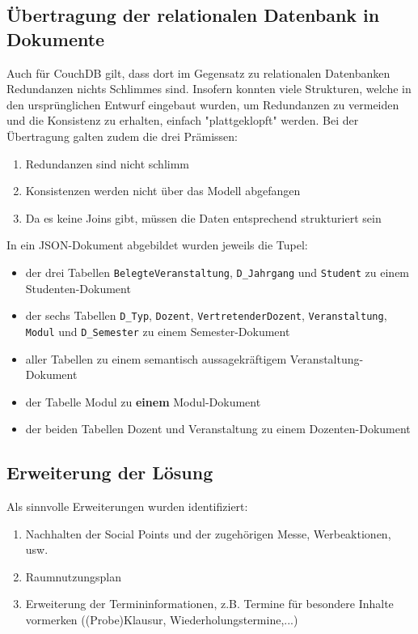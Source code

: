 \vspace{18pt}

\subsection{Übertragung der relationalen Datenbank in Dokumente}
Auch für CouchDB gilt, dass dort im Gegensatz zu relationalen Datenbanken Redundanzen nichts Schlimmes sind. Insofern konnten viele Strukturen, welche in den ursprünglichen Entwurf eingebaut wurden, um Redundanzen
zu vermeiden und die Konsistenz zu erhalten, einfach "plattgeklopft" werden.
Bei der Übertragung galten zudem die drei Prämissen:
\begin{enumerate}
    \item Redundanzen sind nicht schlimm
    \item Konsistenzen werden nicht über das Modell abgefangen
    \item  Da es keine Joins gibt, müssen die Daten entsprechend strukturiert sein
\end{enumerate}
In ein JSON-Dokument abgebildet wurden jeweils die Tupel:
\begin{itemize}
    \item der drei Tabellen \texttt{BelegteVeranstaltung}, \texttt{D\_Jahrgang} und \texttt{Student} zu einem Studenten-Dokument
    \item der sechs Tabellen \texttt{D\_Typ}, \texttt{Dozent}, \texttt{VertretenderDozent}, \texttt{Veranstaltung}, \texttt{Modul} und \texttt{D\_Semester} zu einem Semester-Dokument
    \item aller Tabellen zu einem semantisch aussagekräftigem Veranstaltung-Dokument
    \item der Tabelle Modul zu \textbf{einem} Modul-Dokument
    \item der beiden Tabellen Dozent und Veranstaltung zu einem Dozenten-Dokument
\end{itemize}

\vspace{18pt}

\subsection{Erweiterung der Lösung}
Als sinnvolle Erweiterungen wurden identifiziert:
\begin{enumerate}
    \item Nachhalten der Social Points und der zugehörigen Messe, Werbeaktionen, usw.
    \item Raumnutzungsplan
    \item Erweiterung der Termininformationen, z.B. Termine für besondere Inhalte vormerken ((Probe)Klausur, Wiederholungstermine,...)
\end{enumerate}

